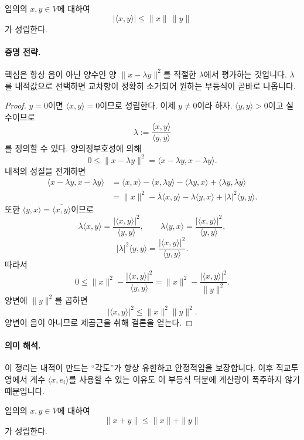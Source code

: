 \begin{theorem}
임의의 $x,y\in V$에 대하여
$$
|\langle x,y\rangle|\le \|x\|\,\|y\|
$$
가 성립한다.
\end{theorem}

\paragraph{증명 전략.}
핵심은 항상 음이 아닌 양수인 양 $\|x-\lambda y\|^2$를 적절한 $\lambda$에서 평가하는 것입니다. $\lambda$를 내적값으로 선택하면 교차항이 정확히 소거되어 원하는 부등식이 곧바로 나옵니다.

\begin{proof}
$y=0$이면 $\langle x,y\rangle=0$이므로 성립한다. 이제 $y\ne0$이라 하자. $\langle y,y\rangle>0$이고 실수이므로
$$
\lambda:=\frac{\langle x,y\rangle}{\langle y,y\rangle}
$$
를 정의할 수 있다. 양의정부호성에 의해
$$
0\le \|x-\lambda y\|^2
= \langle x-\lambda y,x-\lambda y\rangle.
$$
내적의 성질을 전개하면
\begin{align*}
\langle x-\lambda y,x-\lambda y\rangle
&=\langle x,x\rangle-\langle x,\lambda y\rangle-\langle \lambda y,x\rangle+\langle \lambda y,\lambda y\rangle\\
&=\|x\|^2-\overline{\lambda}\langle x,y\rangle-\lambda\langle y,x\rangle+|\lambda|^2\langle y,y\rangle.
\end{align*}
또한 $\langle y,x\rangle=\overline{\langle x,y\rangle}$이므로
$$
\overline{\lambda}\langle x,y\rangle
=\frac{|\langle x,y\rangle|^2}{\langle y,y\rangle},\qquad
\lambda\langle y,x\rangle
=\frac{|\langle x,y\rangle|^2}{\langle y,y\rangle},
$$
$$
|\lambda|^2\langle y,y\rangle
=\frac{|\langle x,y\rangle|^2}{\langle y,y\rangle}.
$$
따라서
$$
0\le \|x\|^2-\frac{|\langle x,y\rangle|^2}{\langle y,y\rangle}
=\|x\|^2-\frac{|\langle x,y\rangle|^2}{\|y\|^2}.
$$
양변에 $\|y\|^2$를 곱하면
$$
|\langle x,y\rangle|^2\le \|x\|^2\|y\|^2.
$$
양변이 음이 아니므로 제곱근을 취해 결론을 얻는다.
\end{proof}

\paragraph{의미 해석.}
이 정리는 내적이 만드는 ``각도''가 항상 유한하고 안정적임을 보장합니다. 이후 직교투영에서 계수 $\langle x,e_i\rangle$를 사용할 수 있는 이유도 이 부등식 덕분에 계산량이 폭주하지 않기 때문입니다.

\begin{theorem}[삼각부등식]
임의의 $x,y\in V$에 대하여
$$
\|x+y\|\le \|x\|+\|y\|
$$
가 성립한다.
\end{theorem}

